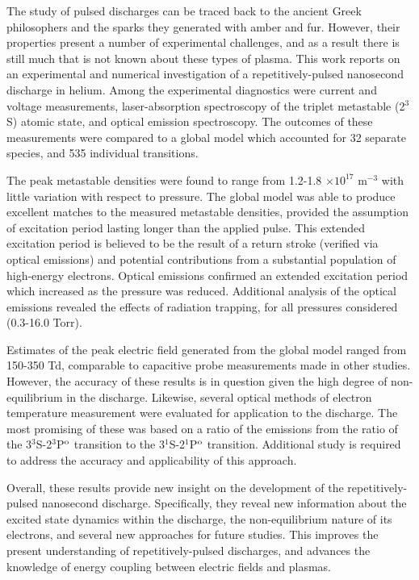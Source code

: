 The study of pulsed discharges can be traced back to the ancient Greek
philosophers and the sparks they generated with amber and fur. However, their
properties present a number of experimental challenges, and as a result there is
still much that is not known about these types of plasma. This work reports on
an experimental and numerical investigation of a repetitively-pulsed nanosecond
discharge in helium. Among the experimental diagnostics were current and voltage
measurements, laser-absorption spectroscopy of the triplet metastable (2$^3$S)
atomic state, and optical emission spectroscopy. The outcomes of these
measurements were compared to a global model which accounted for 32 separate
species, and 535 individual transitions.

The peak metastable densities were found to range from 1.2-1.8 $\times10^{17}$
m$^{-3}$ with little variation with respect to pressure. The global model
was able to produce excellent matches to the measured metastable densities,
provided the assumption of excitation period lasting longer than the applied
pulse. This extended excitation period is believed to be the result of a return
stroke (verified via optical emissions) and potential contributions from a
substantial population of high-energy electrons. Optical emissions confirmed an
extended excitation period which increased as the pressure was reduced.
Additional analysis of the optical emissions revealed the effects of radiation
trapping, for all pressures considered (0.3-16.0 Torr).

Estimates of the peak electric field generated from the global model ranged from
150-350 Td, comparable to capacitive probe measurements made in other studies.
However, the accuracy of these results is in question given the high degree of
non-equilibrium in the discharge. Likewise, several optical methods of electron
temperature measurement were evaluated for application to the discharge. The
most promising of these was based on a ratio of the emissions from the ratio of
the 3$^3$S-2$^3$P$^\mathrm{o}$ transition to the 3$^1$S-2$^1$P$^\mathrm{o}$ transition.
Additional study is required to address the accuracy and applicability of this
approach.

Overall, these results provide new insight on the development of the
repetitively-pulsed nanosecond discharge. Specifically, they reveal new
information about the excited state dynamics within the discharge, the
non-equilibrium nature of its electrons, and several new approaches for future
studies. This improves the present understanding of repetitively-pulsed
discharges, and advances the knowledge of energy coupling between electric
fields and plasmas.
